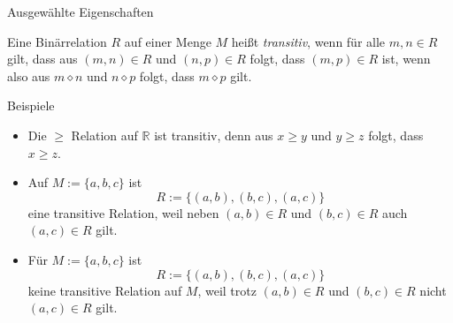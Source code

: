 \documentclass[
  8pt,
  ignorenonframetext,
]{beamer}
\providecommand{\tightlist}{%
  \setlength{\itemsep}{0pt}\setlength{\parskip}{0pt}}
\begin{document}
\begin{frame}{Ausgewählte Eigenschaften}
\protect\hypertarget{ausgewuxe4hlte-eigenschaften-3}{}
\small
\begin{definition}[Transitivität]
\justifying
Eine Binärrelation $R$ auf einer Menge $M$ heißt \textit{transitiv}, wenn für alle
$m,n\in R$ gilt, dass aus $(m,n)\in R$ und $(n,p)\in R$ folgt, dass $(m,p) \in R$ ist,
wenn also aus $m \diamond n$ und $n \diamond p$ folgt, dass $m \diamond p$ gilt.
\end{definition}

\footnotesize

Beispiele

\begin{itemize}
\tightlist
\item
  Die \(\ge\) Relation auf \(\mathbb{R}\) ist transitiv, denn aus
  \(x \ge y\) und \(y \ge z\) folgt, dass \(x \ge z\).
\item
  Auf \(M := \{a,b,c\}\) ist \begin{equation}
  R := \{(a,b), (b,c), (a,c)\}
  \end{equation} eine transitive Relation, weil neben \((a,b) \in R\)
  und \((b,c) \in R\) auch \((a,c) \in R\) gilt.
\item
  Für \(M := \{a,b,c\}\) ist \begin{equation}
  R := \{(a,b), (b,c), (a,c)\}
  \end{equation} keine transitive Relation auf \(M\), weil trotz
  \((a,b) \in R\) und \((b,c) \in R\) nicht \((a,c) \in R\) gilt.
\end{itemize}
\end{frame}
\end{document}
